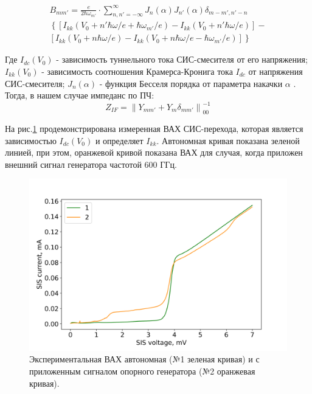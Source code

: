 \documentclass[a4paper]{article}
\begin{document}
\begin{equation}
    \begin{split}
        B_{mm\prime} = \frac{e}{2 \hbar \omega_{m\prime}} \cdot 
        \sum_{n,n\prime=-\infty}^{\infty} J_n(\alpha) J_{n\prime}(\alpha) \delta_{m-m\prime, n\prime-n} \\
        \left\{ \left[ I_{kk}(V_0+n\prime \hbar \omega /e + \hbar \omega_{m\prime}/e) - 
        I_{kk}(V_0 + n\prime \hbar \omega/e) \right] - \right. \\
        \left. \left[ I_{kk}(V_0 + n\hbar \omega/e) - 
        I_{kk}(V_0 + n \hbar \omega/e - \hbar \omega_{m\prime}/e) \right]  \right\}
    \end{split}
\end{equation}

Где $I_{dc}(V_0)$ - зависимость туннельного тока СИС-смесителя от его напряжения; $I_{kk}(V_0)$ - зависимость соотношения Крамерса-Кронига тока $I_{dc}$ от напряжения СИС-смесителя; 
$J_n(\alpha)$ - функция Бесселя порядка  от параметра накачки $\alpha$ .
Тогда, в нашем случае импеданс по ПЧ:
\begin{equation}
    Z_{IF} = \left \| Y_{mm'} + Y_{m} \delta_{mm'} \right \|^{-1}_{00}
    \label{eq:z}
\end{equation}

На рис.\ref{pic-IV} продемонстрирована измеренная ВАХ СИС-перехода, которая является зависимостью $I_{dc}(V_0)$ и определяет $I_{kk}$. 
Автономная кривая показана зеленой линией, при этом, оранжевой кривой показана ВАХ для случая, когда приложен внешний сигнал генератора частотой 600 ГГц. 

\begin{figure}[H]
    \begin{center}
        \includegraphics[scale=0.5]{IV.png}
        \caption{Экспериментальная ВАХ автономная (№1 зеленая кривая) и с приложенным сигналом опорного генератора (№2 оранжевая кривая).}
        \label{pic-IV}
    \end{center}
\end{figure}
\end{document}
